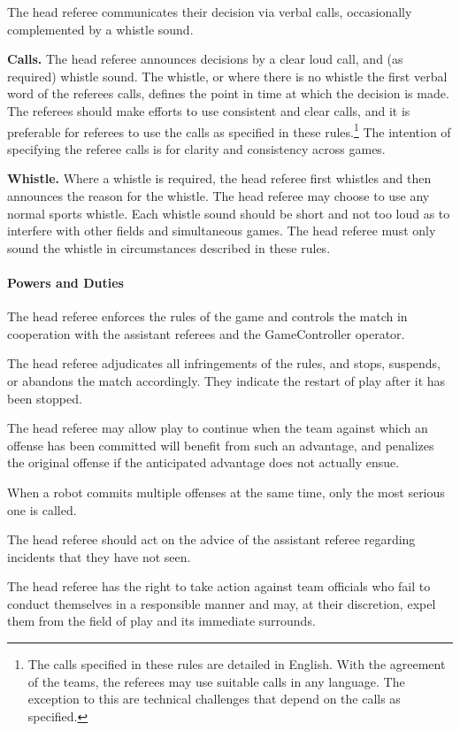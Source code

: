 The head referee communicates their decision via verbal calls, occasionally complemented by a whistle sound.

\textbf{Calls.} The head referee announces decisions by a clear loud call, and (as required) whistle sound. The whistle, or where there is no whistle the first verbal word of the referees calls, defines the point in time at which the decision is made. The referees should make efforts to use consistent and clear calls, and it is preferable for referees to use the calls as specified in these rules.\footnote{The calls specified in these rules are detailed in English. With the agreement of the teams, the referees may use suitable calls in any language. The exception to this are technical challenges that depend on the calls as specified.} The intention of specifying the referee calls is for clarity and consistency across games.

\textbf{Whistle.} Where a whistle is required, the head referee first whistles and then announces the reason for the whistle. The head referee may choose to use any normal sports whistle. Each whistle sound should be short and not too loud as to interfere with other fields and simultaneous games. The head referee must only sound the whistle in circumstances described in these rules.

\paragraph{Powers and Duties}

The head referee enforces the rules of the game and controls the match in cooperation with the assistant referees and the GameController operator.

The head referee adjudicates all infringements of the rules, and stops, suspends, or abandons the match accordingly. They indicate the restart of play after it has been stopped.

The head referee may allow play to continue when the team against which an offense has been committed will benefit from such an advantage, and penalizes the original offense if the anticipated advantage does not actually ensue.

When a robot commits multiple offenses at the same time, only the most serious one is called.

The head referee should act on the advice of the assistant referee regarding incidents that they have not seen.

The head referee has the right to take action against team officials who fail to conduct themselves in a responsible manner and may, at their discretion, expel them from the field of play and its immediate surrounds.

